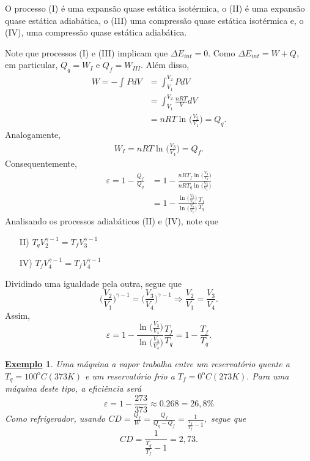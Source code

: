 \documentclass{article}
\newtheorem{example}{\underline{Exemplo}}
\begin{document}
O processo (I) é uma expansão quase estática isotérmica, o (II) é uma expansão quase estática adiabática,
o (III) uma compressão quase estática isotérmica e, o (IV), uma compressão quase estática adiabática.

Note que processos (I) e (III) implicam que \(\Delta E_{int} = 0.\) Como \(\Delta E_{int} = W + Q,\) em particular,
\(Q_{q} = W_{I}\) e \(Q_{f} = W_{III}.\) Além disso,
\begin{align*}
  W = - \int_{}^{}PdV &= \int_{V_{1}}^{V_{2}}PdV\\
                      &= \int_{V_{1}}^{V_{2}}\frac{nRT}{V}dV\\
                      &= nRT \ln^{}{\biggl(\frac{V_{2}}{V_{1}}\biggr)} = Q_{q}.
\end{align*}
Analogamente, 
\begin{align*}
  W_{I} = nRT\ln^{}{\biggl(\frac{V_{3}}{V_{4}}\biggr)} = Q_{f}.
\end{align*}
Consequentemente, 
\begin{align*}
  \varepsilon = 1 - \frac{Q_{f}}{Q_{q}} &= 1 - \frac{nRT_{f}\ln^{}{\biggl(\frac{V_{3}}{V_{4}}\biggr)}}{nRT_{q}\ln^{}{\biggl(\frac{V_{2}}{V_{1}}\biggr)}}\\
                                        &= 1 - \frac{\ln^{}{\biggl(\frac{V_{3}}{V_{4}}\biggr)}}{\ln^{}{\biggl(\frac{V_{2}}{V_{1}}\biggr)}}\frac{T_{f}}{T_{q}}
\end{align*}
Analisando os processos adiabáticos (II) e (IV), note que
\begin{itemize}
  \item[II)] \(T_{q}V_{2}^{\gamma -1} = T_{f}V_{3}^{\gamma -1}\)
  \item[IV)] \(T_{f}V_{4}^{\gamma -1} = T_{f}V_{4}^{\gamma -1}\)
\end{itemize}
Dividindo uma igualdade pela outra, segue que 
\[
  \biggl(\frac{V_{2}}{V_{1}}\biggr)^{\gamma -1} = \biggl(\frac{V_{3}}{V_{4}}\biggr)^{\gamma -1} \Rightarrow \frac{V_{2}}{V_{1}} = \frac{V_{3}}{V_{4}}.
\]
Assim, 
\[
  \varepsilon  = 1 - \frac{\ln^{}{\biggl(\frac{V_{3}}{V_{4}}\biggr)}}{\ln^{}{\biggl(\frac{V_{3}}{V_{4}}\biggr)}}\frac{T_{f}}{T_{q}} = 1 - \frac{T_{f}}{T_{q}}.
\]
\begin{example}
  Uma máquina a vapor trabalha entre um reservatório quente a \(T_{q}={100}^{\mathrm{o}}C (373K)\) e um
reservatório frio a \(T_{f}={0}^{\mathrm{o}}C (273K).\) Para uma máquina deste tipo, a eficiência será 
\[
  \varepsilon  = 1 - \frac{273}{373}\approx 0.268 = 26,8\%
\]
  Como refrigerador, usando \(CD = \frac{Q_{f}}{W} = \frac{Q_{f}}{Q_{q}-Q_{f}} = \frac{1}{\frac{T_{q}}{T_{f}}-1},\) segue que 
\[
  CD = \frac{1}{\frac{T_{q}}{T_{f}}-1} = 2,73.
\]
\end{example}
\end{document}
